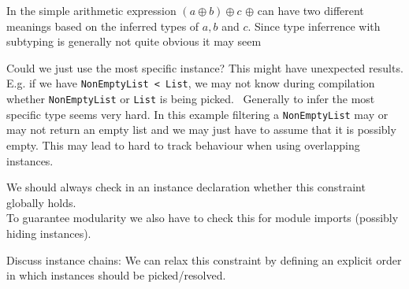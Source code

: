   In the simple arithmetic expression $(a \oplus b) \oplus c$ $\oplus$ can have two different meanings based on the inferred types of $a,b$ and $c$.
  Since type inferrence with subtyping is generally not quite obvious it may seem 

  Could we just use the most specific instance? This might have unexpected results.
  E.g. if we have \texttt{NonEmptyList < List}, we may not know during compilation whether \texttt{NonEmptyList} or \texttt{List} is being picked.
  ~Generally to infer the most specific type seems very hard. In this example filtering a \texttt{NonEmptyList} may or may not return an empty list and we may just have to assume that it is possibly empty.
  This may lead to hard to track behaviour when using overlapping instances.

  We should always check in an instance declaration whether this constraint globally holds. \\
  To guarantee modularity we also have to check this for module imports (possibly hiding instances).

  Discuss instance chains:
  We can relax this constraint by defining an explicit order in which instances should be picked/resolved.
  \cite{morris2010instance}
